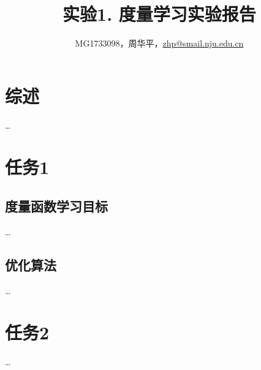\documentclass[a4paper,UTF8]{article}
\theoremstyle{definition}
\begin{document}
\title{实验1. 度量学习实验报告}
\author{MG1733098，周华平，\url{zhp@smail.nju.edu.cn}}
\maketitle

\section*{综述}
	\dots

\section*{任务1}
	\subsection*{度量函数学习目标}
		\dots
	\subsection*{优化算法}
		\dots
		
\section*{任务2}
	\dots
\end{document}
